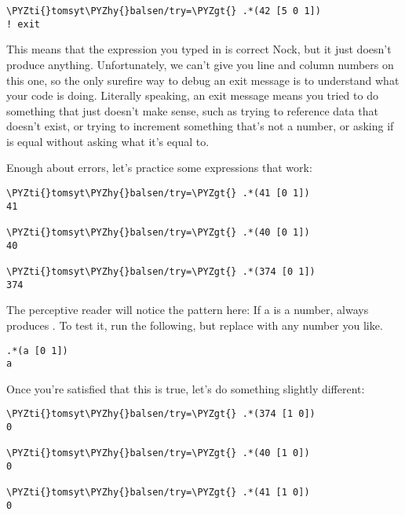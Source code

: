 \begin{framed_shaded}
\begin{Verbatim}[fontsize=\relsize{-2.5},commandchars=\\\{\}]
\PYZti{}tomsyt\PYZhy{}balsen/try=\PYZgt{} .*(42 [5 0 1])
! exit
\end{Verbatim}
\end{framed_shaded}
This means that the expression you typed in is correct Nock, but it just
doesn't produce anything. Unfortunately, we can't give you line and column
numbers on this one, so the only surefire way to debug an exit message is to
understand what your code is doing. Literally speaking, an exit message means
you tried to do something that just doesn't make sense, such as trying to
reference data that doesn't exist, or trying to increment something that's not
a number, or asking if  is equal without asking what it's equal to.

Enough about errors, let's practice some expressions that work:

\begin{framed_shaded}
\begin{Verbatim}[fontsize=\relsize{-2.5},commandchars=\\\{\}]
\PYZti{}tomsyt\PYZhy{}balsen/try=\PYZgt{} .*(41 [0 1])
41

\PYZti{}tomsyt\PYZhy{}balsen/try=\PYZgt{} .*(40 [0 1])
40

\PYZti{}tomsyt\PYZhy{}balsen/try=\PYZgt{} .*(374 [0 1])
374
\end{Verbatim}
\end{framed_shaded}

The perceptive reader will notice the pattern here: If a is a number,  always produces . To test it, run the following, but
replace  with any number you like. 

\begin{framed_shaded}
\begin{Verbatim}[fontsize=\relsize{-2.5},commandchars=\\\{\}]
.*(a [0 1])
a
\end{Verbatim}
\end{framed_shaded}

Once you're satisfied that this is true, let's do something slightly
different:

\begin{framed_shaded}
\begin{Verbatim}[fontsize=\relsize{-2.5},commandchars=\\\{\}]
\PYZti{}tomsyt\PYZhy{}balsen/try=\PYZgt{} .*(374 [1 0])
0

\PYZti{}tomsyt\PYZhy{}balsen/try=\PYZgt{} .*(40 [1 0])
0

\PYZti{}tomsyt\PYZhy{}balsen/try=\PYZgt{} .*(41 [1 0])
0
\end{Verbatim}
\end{framed_shaded}

